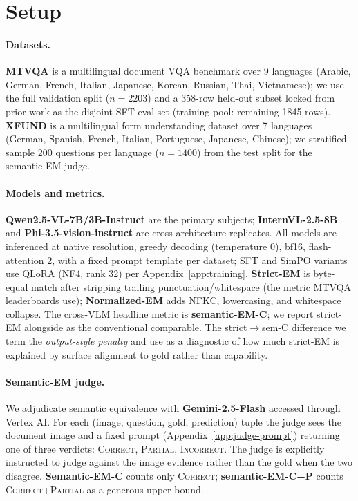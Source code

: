 \section{Setup}
\label{sec:setup}

\paragraph{Datasets.}
\textbf{MTVQA} \citep{tang2024mtvqa} is a multilingual document VQA benchmark over 9 languages (Arabic, German, French, Italian, Japanese, Korean, Russian, Thai, Vietnamese); we use the full validation split ($n=2203$) and a 358-row held-out subset locked from prior work as the disjoint SFT eval set (training pool: remaining 1845 rows). \textbf{XFUND} \citep{xu2022xfund} is a multilingual form understanding dataset over 7 languages (German, Spanish, French, Italian, Portuguese, Japanese, Chinese); we stratified-sample 200 questions per language ($n=1400$) from the test split for the semantic-EM judge.

\paragraph{Models and metrics.}
\textbf{Qwen2.5-VL-7B/3B-Instruct} \citep{bai2025qwen25vl} are the primary subjects; \textbf{InternVL-2.5-8B} \citep{chen2024internvl25} and \textbf{Phi-3.5-vision-instruct} are cross-architecture replicates. All models are inferenced at native resolution, greedy decoding (temperature 0), bf16, flash-attention 2, with a fixed prompt template per dataset; SFT and SimPO variants use QLoRA (NF4, rank 32) per Appendix~\ref{app:training}. \textbf{Strict-EM} is byte-equal match after stripping trailing punctuation/whitespace (the metric MTVQA leaderboards use); \textbf{Normalized-EM} adds NFKC, lowercasing, and whitespace collapse. The cross-VLM headline metric is \textbf{semantic-EM-C}; we report strict-EM alongside as the conventional comparable. The strict$\to$sem-C difference we term the \emph{output-style penalty} and use as a diagnostic of how much strict-EM is explained by surface alignment to gold rather than capability.

\paragraph{Semantic-EM judge.}
We adjudicate semantic equivalence with \textbf{Gemini-2.5-Flash} \citep{google2024gemini25flash} accessed through Vertex AI. For each (image, question, gold, prediction) tuple the judge sees the document image and a fixed prompt (Appendix~\ref{app:judge-prompt}) returning one of three verdicts: \textsc{Correct}, \textsc{Partial}, \textsc{Incorrect}. The judge is explicitly instructed to judge against the image evidence rather than the gold when the two disagree. \textbf{Semantic-EM-C} counts only \textsc{Correct}; \textbf{semantic-EM-C+P} counts \textsc{Correct}+\textsc{Partial} as a generous upper bound.

